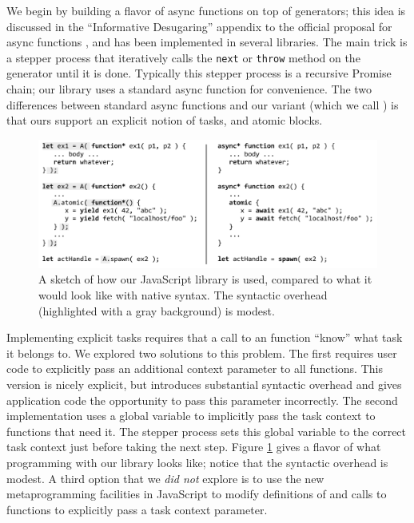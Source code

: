 \documentclass[acmsmall,anonymous,review]{acmart}\settopmatter{printfolios=true,printccs=false,printacmref=false}
\begin{document}
We begin by building a flavor of async functions on top of generators; this idea is discussed in the ``Informative Desugaring'' appendix to the official proposal for async functions \cite{Terlson2016}, and has been implemented in several libraries.
The main trick is a stepper process that iteratively calls the \texttt{next} or \texttt{throw} method on the generator until it is done.
Typically this stepper process is a recursive Promise chain; our library uses a standard async function for convenience.
The two differences between standard async functions and our variant (which we call \emph{\asyncs{}}) is that ours support an explicit notion of tasks, and atomic blocks.

\begin{figure}
\includegraphics[scale=0.75]{Code/trivial_js}
\caption{A sketch of how our JavaScript library is used, compared to what it would look like with native syntax.
  The syntactic overhead (highlighted with a gray background) is modest.}
\label{fig:trivial_js}
\end{figure}

Implementing explicit tasks requires that a call to an \asyncs{} function ``know'' what task it belongs to.
We explored two solutions to this problem.
The first requires user code to explicitly pass an additional context parameter to all \asyncs{} functions.
This version is nicely explicit, but introduces substantial syntactic overhead and gives application code the opportunity to pass this parameter incorrectly.
The second implementation uses a global variable to implicitly pass the task context to functions that need it.
The stepper process sets this global variable to the correct task context just before taking the next step.
Figure \ref{fig:trivial_js} gives a flavor of what programming with our library looks like; notice that the syntactic overhead is modest.
A third option that we \emph{did not} explore is to use the new metaprogramming facilities in JavaScript to modify definitions of and calls to \asyncs{} functions to explicitly pass a task context parameter.
\end{document}
